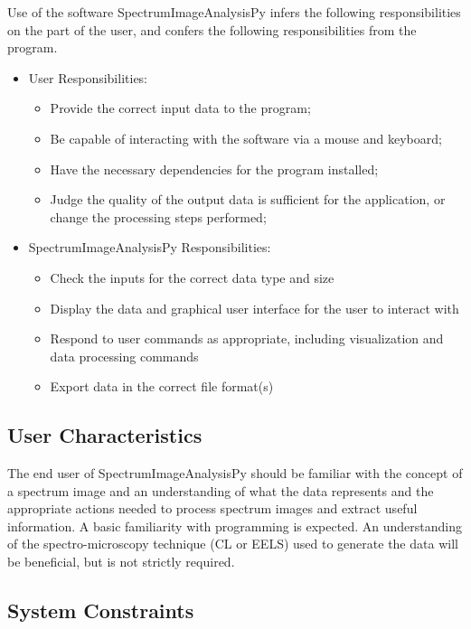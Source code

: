 \documentclass[12pt]{article}
\newcommand{\progname}{SpectrumImageAnalysisPy} %
\begin{document}
Use of the software \progname{} infers the following responsibilities on the part of the user, and confers the following responsibilities from the program.

\begin{itemize}
	\item User Responsibilities:
	\begin{itemize}
		\item Provide the correct input data to the program;
		\item Be capable of interacting with the software via a mouse and keyboard;
		\item Have the necessary dependencies for the program installed;
		\item Judge the quality of the output data is sufficient for the application, or change the processing steps performed;
	\end{itemize}
	\item \progname{} Responsibilities:
	\begin{itemize}
		\item Check the inputs for the correct data type and size
		\item Display the data and graphical user interface for the user to interact with
		\item Respond to user commands as appropriate, including visualization and data processing commands
		\item Export data in the correct file format(s)
	\end{itemize}
\end{itemize}

\subsection{User Characteristics} \label{SecUserCharacteristics}

The end user of \progname{} should be familiar with the concept of a spectrum
image and an understanding of what the data represents and the appropriate
actions needed to process spectrum images and extract useful information. A basic familiarity with programming is expected. An
understanding of the spectro-microscopy technique (CL or EELS) used to generate the data will
be beneficial, but is not strictly required. 

\subsection{System Constraints}
\end{document}

